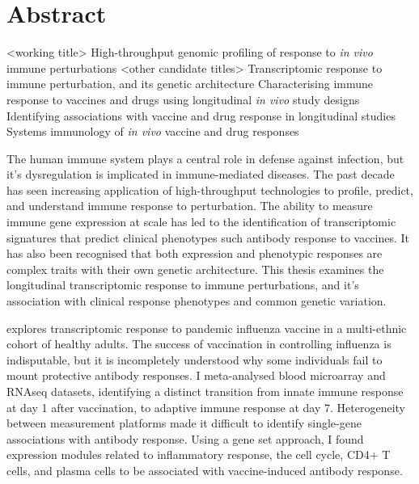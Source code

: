 %
%
\chapter*{Abstract}

\begin{outline}

\1 <working title>
    \2 High-throughput genomic profiling of response to \textit{in vivo} immune perturbations
\1 <other candidate titles>
    \2 Transcriptomic response to immune perturbation, and its genetic architecture
    \2 Characterising immune response to vaccines and drugs using longitudinal \textit{in vivo} study designs
    \2 Identifying associations with vaccine and drug response in longitudinal studies
    \2 Systems immunology of \textit{in vivo} vaccine and drug responses

\end{outline}

The human immune system plays a central role in defense against infection, 
but it's dysregulation is implicated in immune-mediated diseases.
The past decade has seen increasing application of high-throughput technologies to profile, predict, and understand immune response to perturbation.
The ability to measure immune gene expression at scale has led to the identification of 
transcriptomic signatures that predict clinical phenotypes such antibody response to vaccines.
It has also been recognised that both expression and phenotypic responses are complex traits with their own genetic architecture.
This thesis examines the longitudinal transcriptomic response to immune perturbations,
and it's association with clinical response phenotypes and common genetic variation.

 explores transcriptomic response to pandemic influenza vaccine in a multi-ethnic cohort of healthy adults.
The success of vaccination in controlling influenza is indisputable, 
but it is incompletely understood why some individuals fail to mount protective antibody responses.
I meta-analysed blood microarray and \gls{RNAseq} datasets, 
identifying a distinct transition from innate immune response at day 1 after vaccination, to adaptive immune response at day 7.
Heterogeneity between measurement platforms made it difficult to identify single-gene associations with antibody response.
Using a gene set approach, I found expression modules related to inflammatory response, the cell cycle, CD4+ T cells, and plasma cells 
to be associated with vaccine-induced antibody response.

